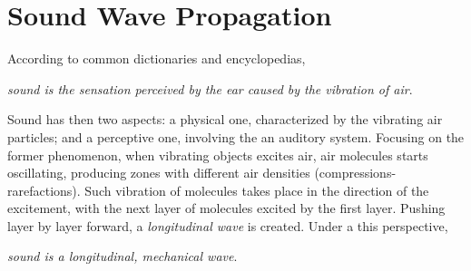 \section{Sound Wave Propagation}\label{ch:acoustics:sec:wave}
According to common dictionaries and encyclopedias,
\begin{center}
    \textit{sound is the sensation perceived by the ear caused by the vibration of air}.
\end{center}
Sound has then two aspects: a physical one, characterized by the vibrating air particles; and a perceptive one, involving the an auditory system.
Focusing on the former phenomenon, when vibrating objects excites air, air molecules starts oscillating,
producing zones with different air densities (compressions-rarefactions).
Such vibration of molecules takes place in the direction of the excitement, with the next layer of molecules excited by the first layer.
Pushing layer by layer forward, a \textit{longitudinal wave} is created.
Under a this perspective,
\begin{center}
    \textit{sound is a longitudinal, mechanical wave}.
\end{center}
